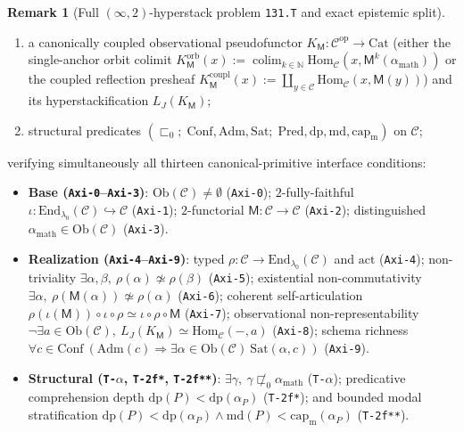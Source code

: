 \documentclass[11pt]{article}
\theoremstyle{plain}
\theoremstyle{definition}
\newtheorem{remark}[theorem]{Remark}
\newcommand{\cC}{\mathcal{C}}
\newcommand{\Ob}{\mathrm{Ob}}
\newcommand{\Hom}{\mathrm{Hom}}
\newcommand{\Cat}{\mathrm{Cat}}
\DeclareMathOperator{\colim}{colim}
\begin{document}
\begin{remark}[Full $(\infty,2)$-hyperstack problem \texttt{131.T} and exact epistemic split]
\begin{enumerate}[nosep,label=(\arabic*)]
\item a canonically coupled observational pseudofunctor $K_{\mathsf{M}} : \cC^{\mathrm{op}} \to \Cat$ (either the single-anchor orbit colimit $K_{\mathsf{M}}^{\mathrm{orb}}(x) := \colim_{k \in \mathbb{N}} \Hom_{\cC}(x, \mathsf{M}^k(\alpha_{\mathrm{math}}))$ or the coupled reflection presheaf $K_{\mathsf{M}}^{\mathrm{coupl}}(x) := \coprod_{y \in \cC} \Hom_{\cC}(x, \mathsf{M}(y))$) and its hyperstackification $L_J(K_{\mathsf{M}})$;
\item structural predicates $(\sqsubset_0;\; \mathrm{Conf}, \mathrm{Adm}, \mathrm{Sat};\; \mathrm{Pred}, \mathrm{dp}, \mathrm{md}, \mathrm{cap}_{\mathrm{m}})$ on $\cC$;
\end{enumerate}
verifying simultaneously all thirteen canonical-primitive interface conditions:
\begin{itemize}[nosep]
\item \textbf{Base (\texttt{Axi-0}--\texttt{Axi-3})}: $\Ob(\cC) \neq \emptyset$ (\texttt{Axi-0}); $2$-fully-faithful $\iota : \mathrm{End}_{\lambda_0}(\cC) \hookrightarrow \cC$ (\texttt{Axi-1}); $2$-functorial $\mathsf{M} : \cC \to \cC$ (\texttt{Axi-2}); distinguished $\alpha_{\mathrm{math}} \in \Ob(\cC)$ (\texttt{Axi-3}).
\item \textbf{Realization (\texttt{Axi-4}--\texttt{Axi-9})}: typed $\rho : \cC \to \mathrm{End}_{\lambda_0}(\cC)$ and $\mathrm{act}$ (\texttt{Axi-4}); non-triviality $\exists \alpha, \beta,\ \rho(\alpha) \not\simeq \rho(\beta)$ (\texttt{Axi-5}); existential non-commutativity $\exists \alpha,\ \rho(\mathsf{M}(\alpha)) \not\simeq \rho(\alpha)$ (\texttt{Axi-6}); coherent self-articulation $\rho(\iota(\mathsf{M})) \circ \iota \circ \rho \simeq \iota \circ \rho \circ \mathsf{M}$ (\texttt{Axi-7}); observational non-representability $\neg \exists a \in \Ob(\cC),\ L_J(K_{\mathsf{M}}) \simeq \Hom_{\cC}(-, a)$ (\texttt{Axi-8}); schema richness $\forall c \in \mathrm{Conf}\ (\mathrm{Adm}(c) \Rightarrow \exists \alpha \in \Ob(\cC)\ \mathrm{Sat}(\alpha, c))$ (\texttt{Axi-9}).
\item \textbf{Structural (\texttt{T-$\alpha$}, \texttt{T-2f*}, \texttt{T-2f**})}: $\exists \gamma,\ \gamma \not\sqsubset_0 \alpha_{\mathrm{math}}$ (\texttt{T-$\alpha$}); predicative comprehension depth $\mathrm{dp}(P) < \mathrm{dp}(\alpha_P)$ (\texttt{T-2f*}); and bounded modal stratification $\mathrm{dp}(P) < \mathrm{dp}(\alpha_P) \wedge \mathrm{md}(P) < \mathrm{cap}_{\mathrm{m}}(\alpha_P)$ (\texttt{T-2f**}).
\end{itemize}


\end{remark}
\end{document}
